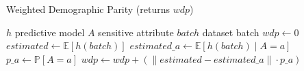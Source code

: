 \begin{algorithm}
    \caption{Weighted Demographic Parity (returns $wdp$)}
    \label{alg:wdp}
    \begin{algorithmic}[1]
        \Require $h$ \hfill predictive model
        \Require $A$ \hfill sensitive attribute
        \Require $batch$ \hfill dataset batch
        \State $wdp \leftarrow 0$
        \State $estimated \leftarrow \mathbb{E}[h(batch)]$
            \State $estimated\_a \leftarrow \mathbb{E}[h(batch) \mid A = a]$
            \State $p\_a \leftarrow \mathbb{P}[A = a]$
            \State $wdp \leftarrow wdp + \left( \| estimated - estimated\_a \| \cdot p\_a \right)$
        \EndFor
    \end{algorithmic}
\end{algorithm}